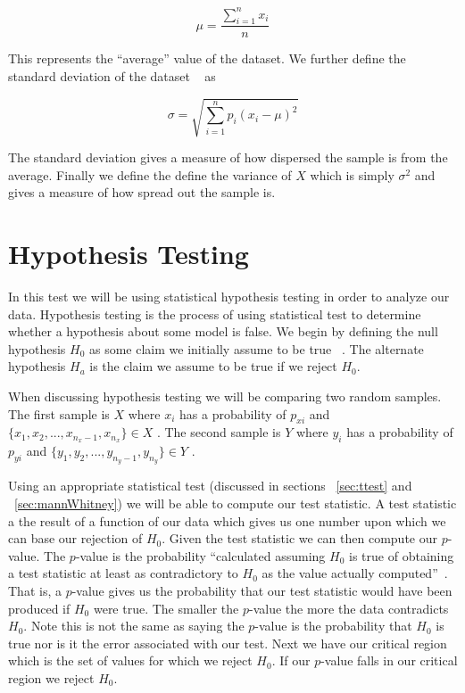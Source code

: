  \begin{equation}\label{mean}
 	\mu=\frac{\sum_{i=1}^{n} x_i}{n}
 \end{equation} 

This represents the ``average'' value of the dataset. We further define the standard deviation of the dataset ~\cite{wackerly_mathematical_2007} as 

\begin{equation}\label{sigma}
	\sigma = \sqrt{\sum_{i=1}^{n}p_i(x_i-\mu)^2}
\end{equation}

The standard deviation gives a measure of how dispersed the sample is from the average. Finally we define the define the variance of $X$ which is simply $\sigma^2$ and gives a measure of how spread out the sample is. 

\section{Hypothesis Testing}
In this test we will be using statistical hypothesis testing in order to analyze our data. Hypothesis testing is the process of using statistical test to determine whether a hypothesis about some model is false. We begin by defining the null hypothesis $H_0$ as some claim we initially assume to be true ~\cite{devore_probability_2011}. The alternate hypothesis $H_a$ is the claim we assume to be true if we reject $H_0$. 

When discussing hypothesis testing we will be comparing two random samples. The first sample is $X$ where  $x_i$ has a probability of  $p_{xi}$ and $\{x_1,x_2,...,x_{n_x-1} , x_{n_x}\} \in X$ . The second sample is $Y$ where  $y_i$ has a probability of  $p_{yi}$ and $\{y_1,y_2,...,y_{n_y-1} , y_{n_y}\} \in Y$ .

Using an appropriate statistical test (discussed in sections ~\ref{sec:ttest} and ~\ref{sec:mannWhitney}) we will be able to compute our test statistic. A test statistic a the result of a function of our data which gives us one number upon which we can base our rejection of $H_0$. Given the test statistic we can then compute our $p$-value. The $p$-value is the probability ``calculated assuming $H_0$ is true of obtaining a test statistic at least as contradictory to $H_0$ as the value actually computed''~\cite{devore_probability_2011}. That is, a $p$-value gives us the probability that our test statistic would have been produced if $H_0$ were true. The smaller the $p$-value the more the data contradicts $H_0$. Note this is not the same as saying the $p$-value is the probability that $H_0$ is true nor is it the error associated with our test. Next we have our critical region which is the set of values for which we reject $H_0$. If our $p$-value falls in our critical region we reject $H_0$.

